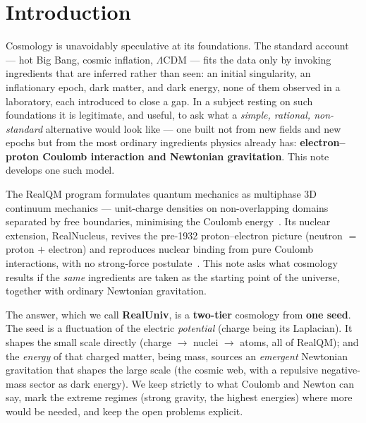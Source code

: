 \documentclass[11pt]{article}
\begin{document}
\section{Introduction}
Cosmology is unavoidably speculative at its foundations. The standard account --- hot Big Bang, cosmic
inflation, $\Lambda$CDM --- fits the data only by invoking ingredients that are inferred rather than seen: an
initial singularity, an inflationary epoch, dark matter, and dark energy, none of them observed in a laboratory,
each introduced to close a gap. In a subject resting on such foundations it is
legitimate, and useful, to ask what a \emph{simple, rational, non-standard} alternative would look like --- one
built not from new fields and new epochs but from the most ordinary ingredients physics already has:
\textbf{electron--proton Coulomb interaction and Newtonian gravitation}. This note develops one such model.

The RealQM program formulates quantum mechanics as multiphase 3D continuum mechanics --- unit-charge densities on
non-overlapping domains separated by free boundaries, minimising the Coulomb energy~\cite{realqm}. Its nuclear
extension, RealNucleus, revives the pre-1932 proton--electron picture (neutron $=$ proton $+$ electron) and
reproduces nuclear binding from pure Coulomb interactions, with no strong-force postulate~\cite{realnucleus}. This
note asks what cosmology results if the \emph{same} ingredients are taken as the starting point of the universe,
together with ordinary Newtonian gravitation.

The answer, which we call \textbf{RealUniv}, is a \textbf{two-tier} cosmology from \textbf{one seed}. The seed is a
fluctuation of the electric \emph{potential} (charge being its Laplacian). It
shapes the small scale directly (charge $\to$ nuclei $\to$ atoms, all of RealQM); and the \emph{energy} of that
charged matter, being mass, sources an \emph{emergent} Newtonian gravitation that shapes the large scale (the
cosmic web, with a repulsive negative-mass sector as dark energy). We keep strictly to what Coulomb and Newton can
say, mark the extreme regimes (strong gravity, the highest energies) where more would be needed, and keep the open
problems explicit.
\end{document}
